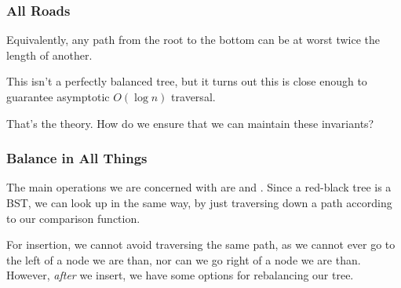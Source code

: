 \documentclass[aspectratio=169]{beamer}
\begin{document}
\begin{frame}
  \frametitle{All Roads}


  \pause
  \vspace{\fill}

  Equivalently, any path from the root to the bottom can be at worst twice the
  length of another.

  \pause
  \vspace{\fill}

  This isn't a perfectly balanced tree, but it turns out this is close enough to guarantee
  asymptotic $O(\log n)$ traversal.

  \pause
  \vspace{\fill}

  That's the theory. How do we ensure that we can maintain these invariants?
\end{frame}


\begin{frame}
  \frametitle{Balance in All Things}

  The main operations we are concerned with are  and . Since a
  red-black tree is a BST, we can look up in the same way, by just traversing down a path
  according to our comparison function.

  \pause
  \vspace{\fill}

  For insertion, we cannot avoid traversing the same path, as we cannot ever go to the
  left of a node we are  than, nor can we go right of a node we are
   than. However, \textit{after} we insert, we have some options for
  rebalancing our tree.

  \pause
  \vspace{\fill}

\end{frame}
\end{document}
